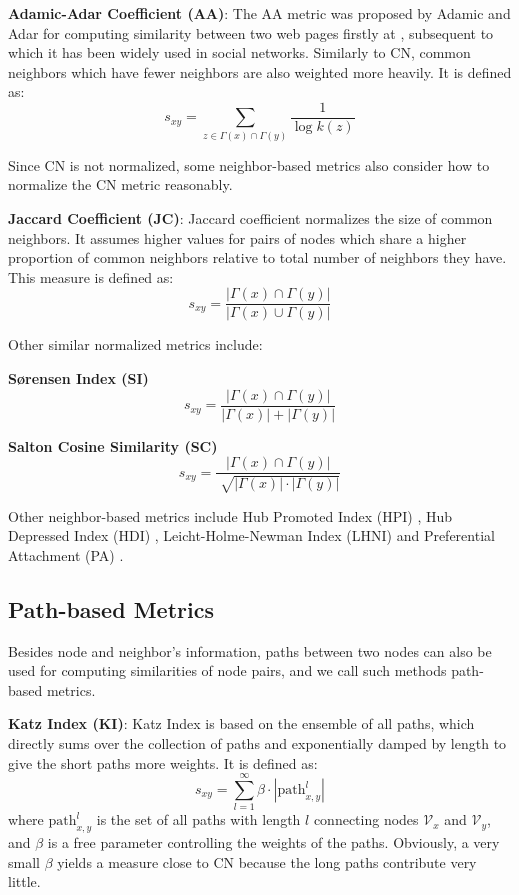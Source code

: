 \documentclass[\main/thesis.tex]{subfiles}
\begin{document}
\textbf{Adamic-Adar Coefficient (AA)}: The AA metric was proposed by Adamic and Adar for computing similarity between two web pages firstly at \cite{adamic2003friends}, subsequent to which it has been widely used in social networks. Similarly to CN, common neighbors which have fewer neighbors are also weighted more heavily. It is defined as:
\begin{equation}
s_{xy}=\sum_{z\in \Gamma(x)\cap\Gamma(y)}\frac{1}{\log{k(z)}}
\end{equation}

Since CN is not normalized, some neighbor-based metrics also consider how to normalize the CN metric reasonably.

\textbf{Jaccard Coefficient (JC)}: Jaccard coefficient \cite{jaccard1901etude} normalizes the size of common neighbors. It assumes higher values for pairs of nodes which share a higher proportion of common neighbors relative to total number of neighbors they have. This measure is defined as:
\begin{equation}
s_{xy}=\frac{|\Gamma(x)\cap\Gamma(y)|}{|\Gamma(x)\cup\Gamma(y)|}
\end{equation}

Other similar normalized metrics include:

\textbf{S{\o}rensen Index (SI)} \cite{sorensen1948method}
\begin{equation}
s_{xy}=\frac{|\Gamma(x)\cap\Gamma(y)|}{|\Gamma(x)|+|\Gamma(y)|}
\end{equation}

\textbf{Salton Cosine Similarity (SC)} \cite{salton1986introduction}
\begin{equation}
s_{xy}=\frac{|\Gamma(x)\cap\Gamma(y)|}{\sqrt[]{|\Gamma(x)|\cdot|\Gamma(y)|}}
\end{equation}

Other neighbor-based metrics include Hub Promoted Index (HPI) \cite{ravasz2002hierarchical}, Hub Depressed Index (HDI) \cite{zhou2009predicting}, Leicht-Holme-Newman Index (LHNI) \cite{leicht2006vertex} and Preferential Attachment (PA) \cite{barabasi2002evolution}.
\subsection{Path-based Metrics}
Besides node and neighbor’s information, paths between two nodes can also be used for computing similarities of node pairs, and we call such methods path-based metrics.

\textbf{Katz Index (KI)}: Katz Index \cite{katz1953new} is based on the ensemble of all paths, which directly sums over the collection of paths and exponentially damped by length to give the short paths more weights. It is defined as:
\begin{equation}
s_{xy} = \sum_{l=1}^{\infty}\beta \cdot |\text{path}_{x,y}^{l}|
\end{equation}
where $\text{path}_{x,y}^{l}$ is the set of all paths with length $l$ connecting nodes $\mathcal{V}_x$ and $\mathcal{V}_y$, and $\beta$ is a free parameter controlling the weights of the paths. Obviously, a very small $\beta$ yields a measure close to CN because the long paths contribute very little.
\end{document}
